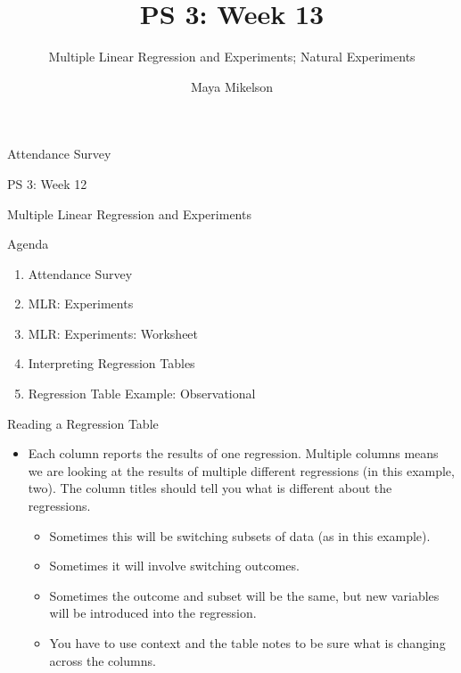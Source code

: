 \documentclass[
  11pt,
  ignorenonframetext,
]{beamer}
\title{\texorpdfstring{PS 3: Week 13}{PS 3: Week 13}}
\subtitle{\texorpdfstring{Multiple Linear Regression and Experiments;
Natural
Experiments}{Multiple Linear Regression and Experiments; Natural Experiments}}
\author{\texorpdfstring{Maya Mikelson}{Maya Mikelson}}
\date{}
\providecommand{\tightlist}{%
  \setlength{\itemsep}{0pt}\setlength{\parskip}{0pt}}
\begin{document}
\frame{\titlepage}

\begin{frame}{Attendance Survey}
\protect{}\label{attendance-survey}
\end{frame}

\begin{frame}{PS 3: Week 12}
\protect{}\label{ps-3-week-12}
\vspace{1.2cm}
\begin{center}
\Large Multiple Linear Regression and Experiments
\end{center}
\end{frame}

\begin{frame}{Agenda}
\protect{}\label{agenda}
\begin{enumerate}
\tightlist
\item
  Attendance Survey
\item
  MLR: Experiments
\item
  MLR: Experiments: Worksheet
\item
  Interpreting Regression Tables
\item
  Regression Table Example: Observational
\end{enumerate}
\end{frame}

\begin{frame}{Reading a Regression Table}
\protect{}\label{reading-a-regression-table}
\begin{itemize}
\tightlist
\item
  Each column reports the results of one regression. Multiple columns
  means we are looking at the results of multiple different regressions
  (in this example, two). The column titles should tell you what is
  different about the regressions. \pause

  \begin{itemize}
  \tightlist
  \item
    Sometimes this will be switching subsets of data (as in this
    example). \pause
  \item
    Sometimes it will involve switching outcomes. \pause
  \item
    Sometimes the outcome and subset will be the same, but new variables
    will be introduced into the regression. \pause
  \item
    You have to use context and the table notes to be sure what is
    changing across the columns.
  \end{itemize}
\end{itemize}
\end{frame}
\end{document}
